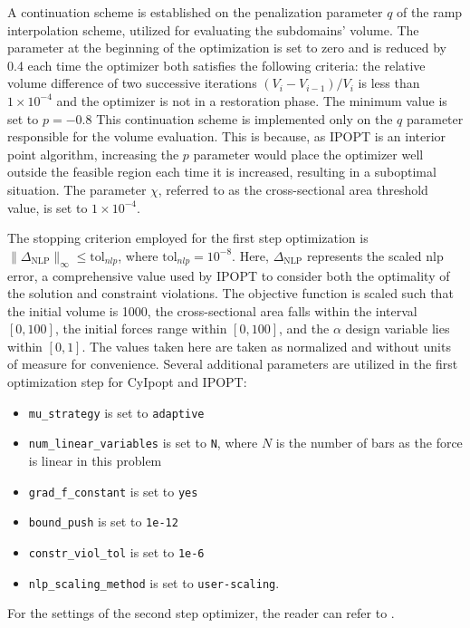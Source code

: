 A continuation scheme is established on the penalization parameter $q$ of the \gls{ramp} interpolation scheme, utilized for evaluating the subdomains' volume. The parameter at the beginning of the optimization is set to zero and is reduced by 0.4 each time the optimizer both satisfies the following criteria: the relative volume difference of two successive iterations $(V_i-V_{i-1})/V_i$ is less than $1 \times 10^{-4}$ and the optimizer is not in a restoration phase. The minimum value is set to $p=-0.8$ This continuation scheme is implemented only on the $q$ parameter responsible for the volume evaluation. This is because, as IPOPT is an interior point algorithm,  increasing the $p$ parameter would place the optimizer well outside the feasible region each time it is increased, resulting in a suboptimal situation. The parameter $\chi$, referred to as the cross-sectional area threshold value, is set to $1 \times 10^{-4}$. 

The stopping criterion employed for the first step optimization is $\|\Delta_{\text{NLP}}\|_\infty \leq \text{tol}_{nlp}$, where $\text{tol}_{nlp}=10^{-8}$. Here, $\Delta_{\text{NLP}}$ represents the scaled \gls{nlp} error, a comprehensive value used by IPOPT to consider both the optimality of the solution and constraint violations. The objective function is scaled such that the initial volume is 1000, the cross-sectional area falls within the interval $[0,100]$, the initial forces range within $[0,100]$, and the $\alpha$ design variable lies within $[0,1]$. The values taken here are taken as normalized and without units of measure for convenience. Several additional parameters are utilized in the first optimization step for CyIpopt and IPOPT:
\begin{itemize}
    \item \texttt{mu\_strategy} is set to \texttt{adaptive}
    \item \texttt{num\_linear\_variables} is set to \texttt{N}, where $N$ is the number of bars as the force is linear in this problem
    \item \texttt{grad\_f\_constant} is set to \texttt{yes}
    \item \texttt{bound\_push} is set to \texttt{1e-12}
    \item \texttt{constr\_viol\_tol} is set to \texttt{1e-6}
    \item \texttt{nlp\_scaling\_method} is set to \texttt{user-scaling}.
\end{itemize}
For the settings of the second step optimizer, the reader can refer to .

